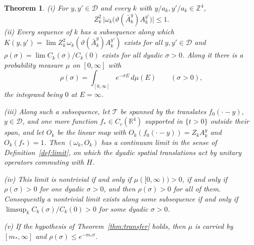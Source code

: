 \documentclass[aps,prd,twocolumn,superscriptaddress,nofootinbib,longbibliography,floatfix,amsmath,amssymb,10pt]{revtex4-2}
\newtheorem{theorem}{Theorem}
\theoremstyle{definition}
\theoremstyle{remark}
\newcommand{\R}{\mathbb{R}}
\newcommand{\Z}{\mathbb{Z}}
\begin{document}
\begin{theorem}\label{thm:flowlimit}
\textup{(i)} For $y,y'\in\mathcal D$ and every $k$ with $y/a_k,y'/a_k\in\Z^4$,
\[
Z_k^2\,\bigl|\omega_k\bigl(\vartheta(\bar A^y_k)A^{y'}_k\bigr)\bigr|\le1 .
\]
\textup{(ii)} Every sequence of $k$ has a subsequence along which
$K(y,y')=\lim Z_k^2\,\omega_k(\vartheta(\bar A^y_k)A^{y'}_k)$ exists for all
$y,y'\in\mathcal D$ and $\rho(\sigma)=\lim C_k(\sigma)/C_k(0)$ exists for all
dyadic $\sigma>0$. Along it there is a probability measure $\mu$ on $[0,\infty]$
with
\[
\rho(\sigma)=\int_{[0,\infty]}e^{-\sigma E}\,d\mu(E)\qquad(\sigma>0),
\]
the integrand being $0$ at $E=\infty$.

\textup{(iii)} Along such a subsequence, let $\mathcal T$ be spanned by the
translates $f_0(\cdot-y)$, $y\in\mathcal D$, and one more function $f_*\in
C_c(\R^4)$ supported in $\{t>0\}$ outside their span, and let $O_k$ be the
linear map with $O_k(f_0(\cdot-y))=Z_kA^y_k$ and $O_k(f_*)=1$. Then
$(\omega_k,O_k)$ has a continuum limit in the sense of
Definition~\ref{def:limit}, on which the dyadic spatial translations act by
unitary operators commuting with $H$.

\textup{(iv)} This limit is nontrivial if and only if $\mu([0,\infty))>0$, if and
only if $\rho(\sigma)>0$ for one dyadic $\sigma>0$, and then $\rho(\sigma)>0$
for all of them. Consequently a nontrivial limit exists along some subsequence
if and only if $\limsup_kC_k(\sigma)/C_k(0)>0$ for some dyadic $\sigma>0$.

\textup{(v)} If the hypothesis of Theorem~\ref{thm:transfer} holds, then $\mu$
is carried by $[m_*,\infty]$ and $\rho(\sigma)\le e^{-m_*\sigma}$.
\end{theorem}
\end{document}
